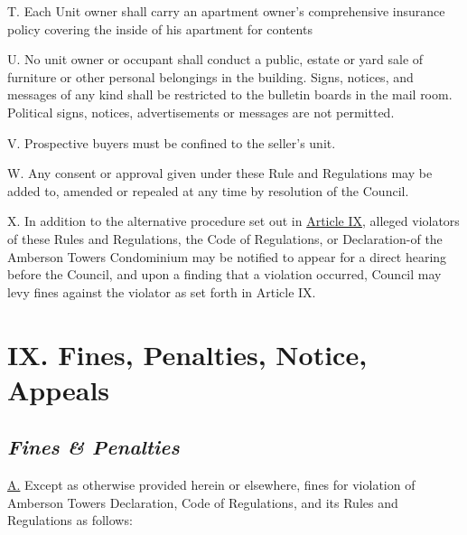 \documentclass[
]{book}
\begin{document}
T. Each Unit owner shall carry an apartment owner's comprehensive insurance policy covering the inside of his apartment for contents

U. No unit owner or occupant shall conduct a public, estate or yard sale of furniture or other personal belongings in the building. Signs, notices, and messages of any kind shall be restricted to the bulletin boards in the mail room. Political signs, notices, advertisements or messages are not permitted.

V. Prospective buyers must be confined to the seller's unit.

W. Any consent or approval given under these Rule and Regulations may be added to, amended or repealed at any time by resolution of the Council.

X. In addition to the alternative procedure set out in \protect\hyperlink{ArtIX}{Article IX}, alleged violators of these Rules and Regulations, the Code of Regulations, or Declaration-of the Amberson Towers Condominium may be notified to appear for a direct hearing before the Council, and upon a finding that a violation occurred, Council may levy fines against the violator as set forth in Article IX.

\hypertarget{ix.-fines-penalties-notice-appeals}{%
\section*{IX. Fines, Penalties, Notice, Appeals}\label{ix.-fines-penalties-notice-appeals}}

\hypertarget{fines-penalties}{%
\subsection*{\texorpdfstring{\emph{Fines \& Penalties}}{Fines \& Penalties}}\label{fines-penalties}}

\protect\hyperlink{ArtIX}{A.} Except as otherwise provided herein or elsewhere, fines for violation of Amberson Towers Declaration, Code of Regulations, and its Rules and Regulations as follows:
\end{document}
